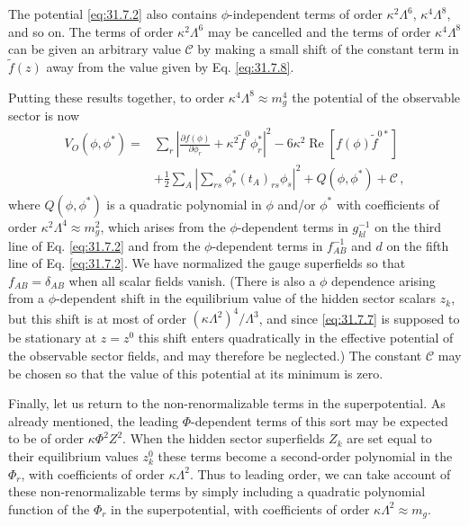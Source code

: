 The potential \eqref{eq:31.7.2} also contains \(\phi\)-independent terms of
order \(\kappa^2\Lambda^6\), \(\kappa^4\Lambda^8\), and so on. The terms of
order \(\kappa^2\Lambda^6\) may be cancelled and the terms of order
\(\kappa^4\Lambda^8\) can be given an arbitrary value \(\mathcal C\) by
making a small shift of the constant term in \(\widetilde f(z)\) away from
the value given by Eq. \eqref{eq:31.7.8}.

Putting these results together, to order
\(\kappa^4\Lambda^8\approx m_g^4\) the potential of the observable sector
is now
\begin{equation}
  \begin{aligned}
  V_O(\phi,\phi^*)={}&
  \sum_r\left|
    \frac{\partial f(\phi)}{\partial\phi_r}
    +\kappa^2\widetilde f^0\phi_r^*
  \right|^2
  -6\kappa^2\operatorname{Re}
    \left[f(\phi)\widetilde f^{0*}\right]
  \\
  &+\frac12\sum_A\left|
    \sum_{rs}\phi_r^*(t_A)_{rs}\phi_s
  \right|^2
  +Q(\phi,\phi^*)+\mathcal C\,,
  \end{aligned}
  \tag{31.7.10}\label{eq:31.7.10}
\end{equation}
where \(Q(\phi,\phi^*)\) is a quadratic polynomial in \(\phi\) and/or
\(\phi^*\) with coefficients of order
\(\kappa^2\Lambda^4\approx m_g^2\), which arises from the
\(\phi\)-dependent terms in \(g_{kl}^{-1}\) on the third line of
Eq. \eqref{eq:31.7.2} and from the \(\phi\)-dependent terms in
\(f_{AB}^{-1}\) and \(d\) on the fifth line of Eq. \eqref{eq:31.7.2}. We
have normalized the gauge superfields so that \(f_{AB}=\delta_{AB}\) when
all scalar fields vanish. (There is also a \(\phi\) dependence arising from
a \(\phi\)-dependent shift in the equilibrium value of the hidden sector
scalars \(z_k\), but this shift is at most of order
\((\kappa\Lambda^2)^4/\Lambda^3\), and since \eqref{eq:31.7.7} is supposed
to be stationary at \(z=z^0\) this shift enters quadratically in the
effective potential of the observable sector fields, and may therefore be
neglected.) The constant \(\mathcal C\) may be chosen so that the value of
this potential at its minimum is zero.

Finally, let us return to the non-renormalizable terms in the
superpotential. As already mentioned, the leading \(\Phi\)-dependent terms
of this sort may be expected to be of order \(\kappa\Phi^2Z^2\). When the
hidden sector superfields \(Z_k\) are set equal to their equilibrium values
\(z_k^0\) these terms become a second-order polynomial in the \(\Phi_r\),
with coefficients of order \(\kappa\Lambda^2\). Thus to leading order, we
can take account of these non-renormalizable terms by simply including a
quadratic polynomial function of the \(\Phi_r\) in the superpotential, with
coefficients of order \(\kappa\Lambda^2\approx m_g\).


